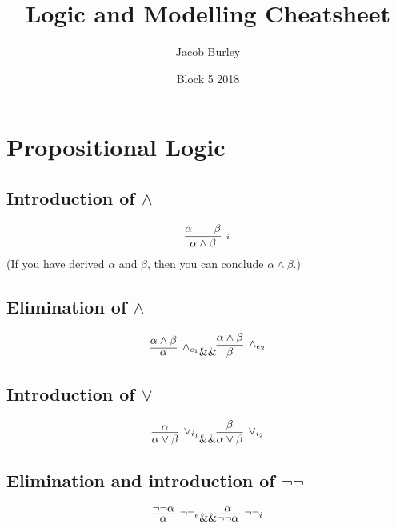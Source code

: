 \documentclass{article}
\title{Logic and Modelling Cheatsheet}
\author{Jacob Burley}
\date{Block 5 2018}
\newcommand{\rulename}[1]{#1}
\begin{document}
\maketitle

\section{Propositional Logic}

\subsection{Introduction of $\wedge$}
    \begin{equation*}
      \infer[\show\rulename{\wedge_i}]
      {\alpha \wedge \beta}
      {\alpha && \beta}
    \end{equation*}
    (If you have derived $\alpha$ and $\beta$, then you can conclude $\alpha \wedge \beta$.)
\subsection{Elimination of $\wedge$}
    \begin{equation*}
      \infer[\rulename{\wedge_{e_1}}]
      {\alpha}
      {\alpha \wedge \beta}
      \&\&
      \infer[\rulename{\wedge_{e_2}}]
      {\beta}
      {\alpha \wedge \beta}
    \end{equation*}

\subsection{Introduction of $\vee$}
    \begin{equation*}
      \infer[\rulename{\vee_{i_1}}]
      {\alpha \vee \beta}
      {\alpha}
      \&\&
      \infer[\rulename{\vee_{i_2}}]
      {\alpha \vee \beta}
      {\beta}
    \end{equation*}
    
\subsection{Elimination and introduction of $\neg\neg$}
    \begin{equation*}
      \infer[\rulename{\neg\neg_e}]
      {\alpha}
      {\neg\neg\alpha}
      \&\&
      \infer[\rulename{\neg\neg_i}]
      {\neg\neg\alpha}
      {\alpha}
    \end{equation*}
    
\end{document}
